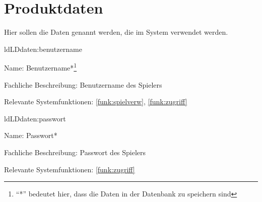 
\section{Produktdaten}\label{section:productdaten}

Hier sollen die Daten genannt werden, die im System verwendet werden.

\setcounter{ld}{10}

\begin{description}[leftmargin=5em, style=sameline]
	
	\begin{lhp}{ld}{LD}{daten:benutzername}
		\item [Name:] Benutzername*\footnote{``*'' bedeutet hier, dass die Daten in der Datenbank zu speichern sind}
		\item [Fachliche Beschreibung:] Benutzername des Spielers
		\item [Relevante Systemfunktionen:] \ref{funk:spielverw}, \ref{funk:zugriff}
	\end{lhp}
	
	\begin{lhp}{ld}{LD}{daten:passwort}
		\item [Name:] Passwort*
		\item [Fachliche Beschreibung:] Passwort des Spielers
		\item [Relevante Systemfunktionen:] \ref{funk:zugriff}
	\end{lhp}
	
	\begin{comment}
	\begin{lhp}{ld}{LD}{daten:raumname}
		\item [Name:]\textcolor{magenta}{Raumname}
		\item [Fachliche Beschreibung:]\textcolor{magenta}{Identifizierung des Raums} 
		\item [Relevante Systemfunktionen:]\ref{funk:spielraum}
	\end{lhp}
	\end{comment}
	
	\begin{comment}
	\begin{lhp}{ld}{LD}{daten:raumkennwort}
		\item [Name:]\textcolor{magenta}{Raumkennwort}
		\item [Fachliche Beschreibung:]\textcolor{magenta}{Identifizierung des Raums} 
		\item [Relevante Systemfunktionen:]\ref{funk:spielraum}
	\end{lhp}
	\end{comment}
	

\end{description}
